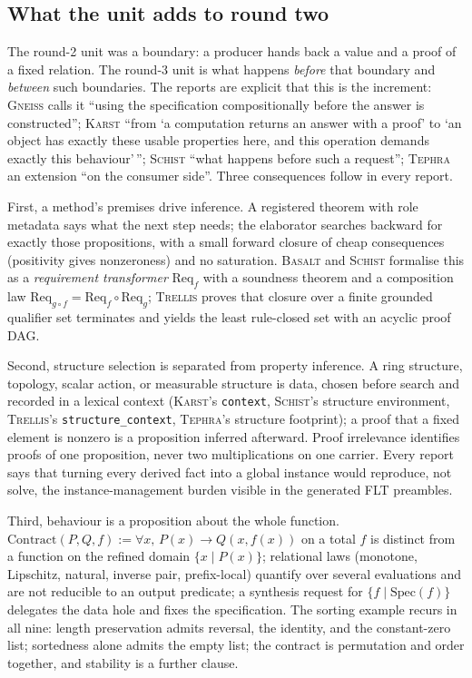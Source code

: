 \documentclass[11pt,a4paper]{article}
\newcommand{\code}[1]{\nolinkurl{#1}}
\newcommand{\Bs}{\textsc{Basalt}}
\newcommand{\Gn}{\textsc{Gneiss}}
\newcommand{\Ks}{\textsc{Karst}}
\newcommand{\Sc}{\textsc{Schist}}
\newcommand{\Tp}{\textsc{Tephra}}
\newcommand{\Tr}{\textsc{Trellis}}
\theoremstyle{definition}
\begin{document}
\subsection{What the unit adds to round two}
The round-2 unit was a boundary: a producer hands back a value and a proof of a fixed relation. The round-3 unit is what happens \emph{before} that boundary and \emph{between} such boundaries. The reports are explicit that this is the increment: \Gn{} calls it ``using the specification compositionally before the answer is constructed''; \Ks{} ``from `a computation returns an answer with a proof' to `an object has exactly these usable properties here, and this operation demands exactly this behaviour'\,''; \Sc{} ``what happens before such a request''; \Tp{} an extension ``on the consumer side''. Three consequences follow in every report.

First, a method's premises drive inference. A registered theorem with role metadata says what the next step needs; the elaborator searches backward for exactly those propositions, with a small forward closure of cheap consequences (positivity gives nonzeroness) and no saturation. \Bs{} and \Sc{} formalise this as a \emph{requirement transformer} $\mathrm{Req}_f$ with a soundness theorem and a composition law $\mathrm{Req}_{g\circ f}=\mathrm{Req}_f\circ\mathrm{Req}_g$; \Tr{} proves that closure over a finite grounded qualifier set terminates and yields the least rule-closed set with an acyclic proof DAG.

Second, structure selection is separated from property inference. A ring structure, topology, scalar action, or measurable structure is data, chosen before search and recorded in a lexical context (\Ks's \code{context}, \Sc's structure environment, \Tr's \code{structure_context}, \Tp's structure footprint); a proof that a fixed element is nonzero is a proposition inferred afterward. Proof irrelevance identifies proofs of one proposition, never two multiplications on one carrier. Every report says that turning every derived fact into a global instance would reproduce, not solve, the instance-management burden visible in the generated FLT preambles.

Third, behaviour is a proposition about the whole function. $\mathrm{Contract}(P,Q,f):=\forall x,\,P(x)\to Q(x,f(x))$ on a total $f$ is distinct from a function on the refined domain $\{x\mid P(x)\}$; relational laws (monotone, Lipschitz, natural, inverse pair, prefix-local) quantify over several evaluations and are not reducible to an output predicate; a synthesis request for $\{f\mid \mathrm{Spec}(f)\}$ delegates the data hole and fixes the specification. The sorting example recurs in all nine: length preservation admits reversal, the identity, and the constant-zero list; sortedness alone admits the empty list; the contract is permutation and order together, and stability is a further clause.
\end{document}

